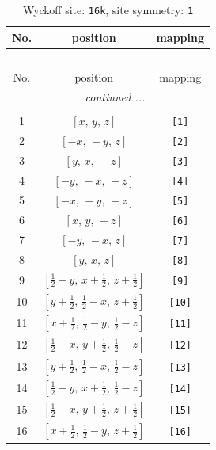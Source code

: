 \documentclass[fleqn,8pt]{jsarticle}
\begin{document}
\begin{longtable}{ccc}
\caption{Wyckoff site: {\tt 16k}, site symmetry: {\tt 1}}
 \\
 \hline \hline
No. & position & mapping \\ \hline \endfirsthead

\multicolumn{2}{l}{\tablename\ \thetable{}} \\
 \hline \hline
No. & position & mapping \\ \hline \endhead

 \hline \hline
\multicolumn{2}{r}{\footnotesize\it continued ...} \\ \endfoot

 \hline \hline
\multicolumn{2}{r}{} \\ \endlastfoot

1 & $\left[ x,\, y,\, z \right]$ & {\tt [1]} \\ \hline
2 & $\left[ - x,\, - y,\, z \right]$ & {\tt [2]} \\ \hline
3 & $\left[ y,\, x,\, - z \right]$ & {\tt [3]} \\ \hline
4 & $\left[ - y,\, - x,\, - z \right]$ & {\tt [4]} \\ \hline
5 & $\left[ - x,\, - y,\, - z \right]$ & {\tt [5]} \\ \hline
6 & $\left[ x,\, y,\, - z \right]$ & {\tt [6]} \\ \hline
7 & $\left[ - y,\, - x,\, z \right]$ & {\tt [7]} \\ \hline
8 & $\left[ y,\, x,\, z \right]$ & {\tt [8]} \\ \hline
9 & $\left[ \frac{1}{2} - y,\, x + \frac{1}{2},\, z + \frac{1}{2} \right]$ & {\tt [9]} \\ \hline
10 & $\left[ y + \frac{1}{2},\, \frac{1}{2} - x,\, z + \frac{1}{2} \right]$ & {\tt [10]} \\ \hline
11 & $\left[ x + \frac{1}{2},\, \frac{1}{2} - y,\, \frac{1}{2} - z \right]$ & {\tt [11]} \\ \hline
12 & $\left[ \frac{1}{2} - x,\, y + \frac{1}{2},\, \frac{1}{2} - z \right]$ & {\tt [12]} \\ \hline
13 & $\left[ y + \frac{1}{2},\, \frac{1}{2} - x,\, \frac{1}{2} - z \right]$ & {\tt [13]} \\ \hline
14 & $\left[ \frac{1}{2} - y,\, x + \frac{1}{2},\, \frac{1}{2} - z \right]$ & {\tt [14]} \\ \hline
15 & $\left[ \frac{1}{2} - x,\, y + \frac{1}{2},\, z + \frac{1}{2} \right]$ & {\tt [15]} \\ \hline
16 & $\left[ x + \frac{1}{2},\, \frac{1}{2} - y,\, z + \frac{1}{2} \right]$ & {\tt [16]} \\
\end{longtable}
\end{document}
